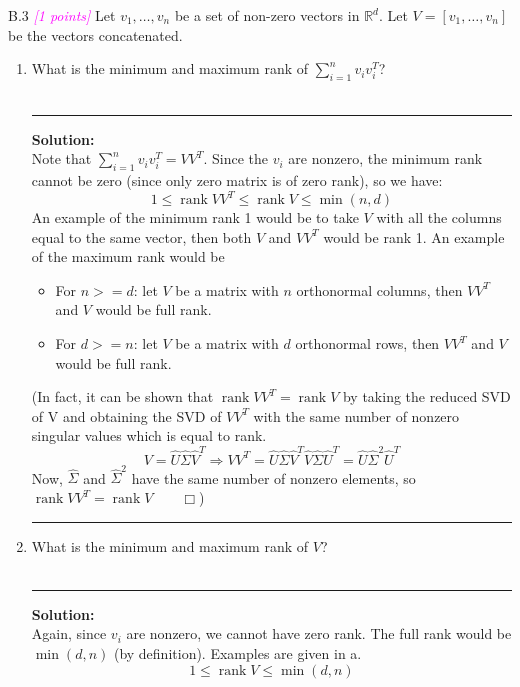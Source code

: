 \documentclass{article}
\newcommand{\1}{\mathbf{1}}
\DeclareMathOperator{\rank}{rank}
\newcommand{\points}[1]{\small\textcolor{magenta}{\emph{[#1 points]}} \normalsize}
\begin{document}
B.3 \points{1} Let $v_1,\dots,v_n$ be a set of non-zero vectors in $\mathbb{R}^d$. Let $V = [v_1,\dots,v_n]$ be the vectors concatenated. 
    \begin{enumerate}
        \item What is the minimum and maximum rank of $\sum_{i=1}^n v_i v_i^T$?
        \\
        \\
            \noindent\rule{\textwidth}{1pt}
            {\bf Solution:}\\
            Note that $\sum_{i=1}^n v_i v_i^T = VV^T$. Since the $v_i$ are nonzero, the minimum rank cannot be zero (since only zero matrix is of zero rank), so we have:
            $$
            \boxed{ 1 \le \rank VV^T \le \rank V \le \min(n,d)}
            $$
            An example of the minimum rank 1 would be to take $V$ with all the columns equal to the same vector, then both $V$ and $VV^T$ would be rank 1.
            An example of the maximum rank would be
            \begin{itemize}
                \item For $n >= d$: let $V$ be a matrix with $n$ orthonormal columns, then $VV^T$ and $V$ would be full rank.
                \item For $d >= n$: let $V$ be a matrix with $d$ orthonormal rows, then $VV^T$ and $V$ would be full rank.
            \end{itemize}
            (In fact, it can be shown that $\rank VV^T = \rank V$ by taking the reduced SVD of V and obtaining the SVD of $VV^T$ with the same number of nonzero singular values which is equal to rank.
            $$
            V = \hat U \hat \Sigma \hat V^T \Rightarrow VV^T = \hat U \hat \Sigma \hat V^T \hat V \hat \Sigma \hat U^T = \hat U \hat \Sigma^2 \hat U^T
            $$
            Now, $\hat \Sigma$ and $\hat \Sigma^2$ have the same number of nonzero elements, so $\rank VV^T = \rank V \qquad \Box$)
            
            \noindent\rule{\textwidth}{1pt}
        \item What is the minimum and maximum rank of $V$?
        \\
        \\
            \noindent\rule{\textwidth}{1pt}
            {\bf Solution:}\\
            Again, since $v_i$ are nonzero, we cannot have zero rank. The full rank would be $\min(d,n)$ (by definition). Examples are given in a.
            $$ 
            \boxed{1 \le \rank V \le \min(d,n)}
            $$
        

\end{enumerate}
\end{document}
